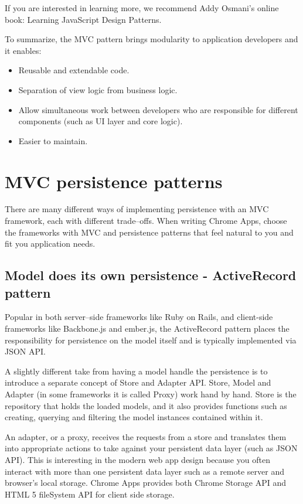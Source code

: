 If you are interested in learning more, we recommend Addy Osmani's online book: Learning JavaScript Design Patterns.

To summarize, the MVC pattern brings modularity to application developers and it enables:
\begin{itemize}
  \item Reusable and extendable code.
  \item Separation of view logic from business logic.
  \item Allow simultaneous work between developers who are responsible for different components (such as UI layer and core logic).
  \item Easier to maintain.
\end{itemize}


\section{MVC persistence patterns}
There are many different ways of implementing persistence with an MVC framework, each with different trade–offs. When writing Chrome Apps, choose the frameworks with MVC and persistence patterns that feel natural to you and fit you application needs.


\subsection{Model does its own persistence - ActiveRecord pattern}
Popular in both server–side frameworks like Ruby on Rails, and client-side frameworks like Backbone.js and ember.js, the ActiveRecord pattern places the responsibility for persistence on the model itself and is typically implemented via JSON API.

A slightly different take from having a model handle the persistence is to introduce a separate concept of Store and Adapter API. Store, Model and Adapter (in some frameworks it is called Proxy) work hand by hand. Store is the repository that holds the loaded models, and it also provides functions such as creating, querying and filtering the model instances contained within it.

An adapter, or a proxy, receives the requests from a store and translates them into appropriate actions to take against your persistent data layer (such as JSON API). This is interesting in the modern web app design because you often interact with more than one persistent data layer such as a remote server and browser's local storage. Chrome Apps provides both Chrome Storage API and HTML 5 fileSystem API for client side storage.

